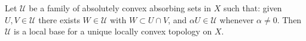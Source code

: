 Let $\mathcal{U}$ be a family of absolutely convex absorbing sets in $X$ such that: given $U, V \in \mathcal{U}$ there exists $W \in \mathcal{U}$ with $W \subset U \cap V$, and $\alpha U \in \mathcal{U}$ whenever $\alpha \neq 0$. Then $\mathcal{U}$ is a local base for a unique locally convex topology on $X$.